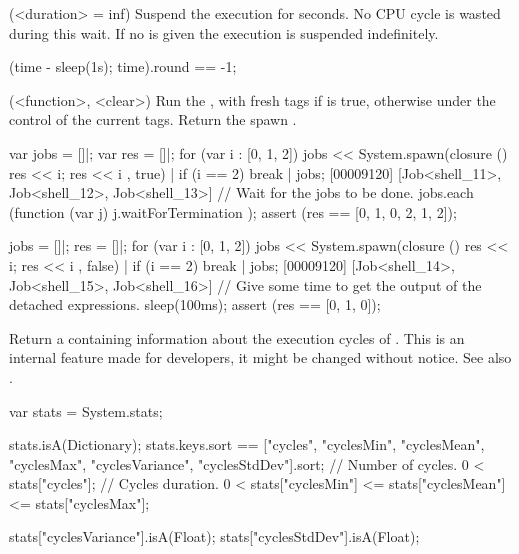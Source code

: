 \begin{urbiscriptapi}
\item[sleep](<duration> = inf)%
  Suspend the execution for  seconds.  No CPU cycle is wasted
  during this wait. If no  is given the execution is suspended
  indefinitely.

\begin{urbiassert}
(time - {sleep(1s); time}).round == -1;
\end{urbiassert}


\item[spawn](<function>, <clear>)%
  Run the , with fresh tags if  is true, otherwise
  under the control of the current tags.  Return the spawn .
\begin{urbiscript}
var jobs = []|;
var res = []|;
for (var i : [0, 1, 2])
{
  jobs << System.spawn(closure () { res << i; res << i },
                       true) |
  if (i == 2)
    break
}|
jobs;
[00009120] [Job<shell_11>, Job<shell_12>, Job<shell_13>]
// Wait for the jobs to be done.
jobs.each (function (var j) { j.waitForTermination });
assert (res == [0, 1, 0, 2, 1, 2]);
\end{urbiscript}

\begin{urbiscript}
jobs = []|;
res = []|;
for (var i : [0, 1, 2])
{
  jobs << System.spawn(closure () { res << i; res << i },
                       false) |
  if (i == 2)
    break
}|
jobs;
[00009120] [Job<shell_14>, Job<shell_15>, Job<shell_16>]
// Give some time to get the output of the detached expressions.
sleep(100ms);
assert (res == [0, 1, 0]);
\end{urbiscript}

\item[stats]%
  Return a  containing information about the execution
  cycles of \urbi.  This is an internal feature made for developers, it
  might be changed without notice.  See also .
\begin{urbiassert}
var stats = System.stats;

stats.isA(Dictionary);
stats.keys.sort == ["cycles",
                    "cyclesMin", "cyclesMean", "cyclesMax",
                    "cyclesVariance", "cyclesStdDev"].sort;
// Number of cycles.
0 < stats["cycles"];
// Cycles duration.
0 < stats["cyclesMin"] <= stats["cyclesMean"] <= stats["cyclesMax"];

stats["cyclesVariance"].isA(Float);
stats["cyclesStdDev"].isA(Float);
\end{urbiassert}



\end{urbiscriptapi}
